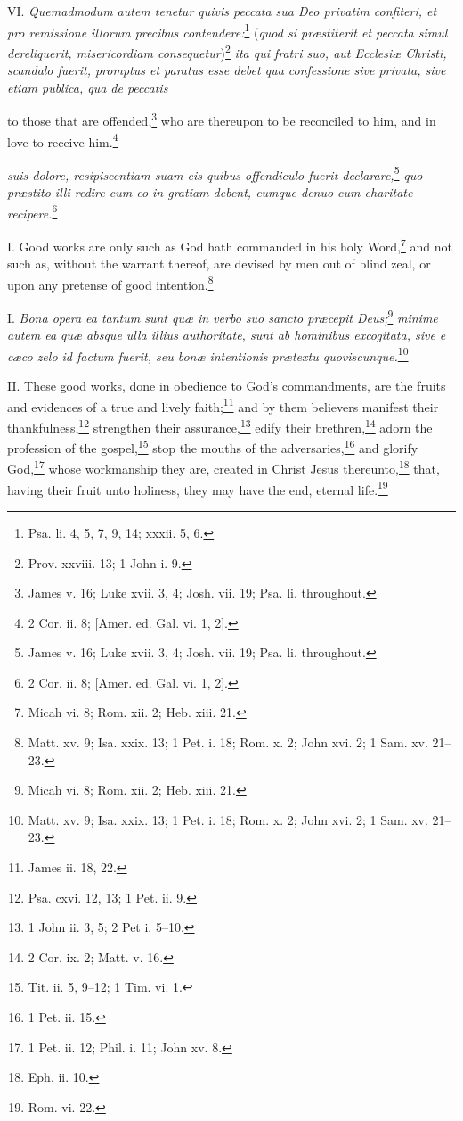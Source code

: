 VI. \emph{Quemadmodum autem tenetur quivis peccata sua Deo privatim confiteri, et pro remissione illorum precibus contendere:}\footnote{Psa. li. 4, 5, 7, 9, 14; xxxii. 5, 6.} (\emph{quod si præstiterit et peccata simul dereliquerit, misericordiam consequetur})\footnote{Prov. xxviii. 13; 1 John i. 9.}\emph{ ita qui fratri suo, aut Ecclesiæ Christi, scandalo fuerit, promptus et paratus esse debet qua confessione sive privata, sive etiam publica, qua de peccatis }

to those that are offended,\footnote{James v. 16; Luke xvii. 3, 4; Josh. vii. 19; Psa. li. throughout.} who are thereupon to be reconciled to him, and in love to receive him.\footnote{2 Cor. ii. 8; [Amer. ed. Gal. vi. 1, 2].}

\emph{suis dolore, resipiscentiam suam eis quibus offendiculo fuerit declarare,}\footnote{James v. 16; Luke xvii. 3, 4; Josh. vii. 19; Psa. li. throughout.}\emph{ quo præstito illi redire cum eo in gratiam debent, eumque denuo cum charitate recipere.}\footnote{2 Cor. ii. 8; [Amer. ed. Gal. vi. 1, 2].}


I. Good works are only such as God hath commanded in his holy Word,\footnote{Micah vi. 8; Rom. xii. 2; Heb. xiii. 21.} and not such as, without the warrant thereof, are devised by men out of blind zeal, or upon any pretense of good intention.\footnote{Matt. xv. 9; Isa. xxix. 13; 1 Pet. i. 18; Rom. x. 2; John xvi. 2; 1 Sam. xv. 21–23.}

I. \emph{Bona opera ea tantum sunt quæ in verbo suo sancto præcepit Deus;}\footnote{Micah vi. 8; Rom. xii. 2; Heb. xiii. 21.}\emph{ minime autem ea quæ absque ulla illius authoritate, sunt ab hominibus excogitata, sive e cæco zelo id factum fuerit, seu bonæ intentionis prætextu quoviscunque.}\footnote{Matt. xv. 9; Isa. xxix. 13; 1 Pet. i. 18; Rom. x. 2; John xvi. 2; 1 Sam. xv. 21–23.}

II. These good works, done in obedience to God's commandments, are the fruits and evidences of a true and lively faith;\footnote{James ii. 18, 22.} and by them believers manifest their thankfulness,\footnote{Psa. cxvi. 12, 13; 1 Pet. ii. 9.} strengthen their assurance,\footnote{1 John ii. 3, 5; 2 Pet i. 5–10.} edify their brethren,\footnote{2 Cor. ix. 2; Matt. v. 16.} adorn the profession of the gospel,\footnote{Tit. ii. 5, 9–12; 1 Tim. vi. 1.} stop the mouths of the adversaries,\footnote{1 Pet. ii. 15.} and glorify God,\footnote{1 Pet. ii. 12; Phil. i. 11; John xv. 8.} whose workmanship they are, created in Christ Jesus thereunto,\footnote{Eph. ii. 10.} that, having their fruit unto holiness, they may have the end, eternal life.\footnote{Rom. vi. 22.}

